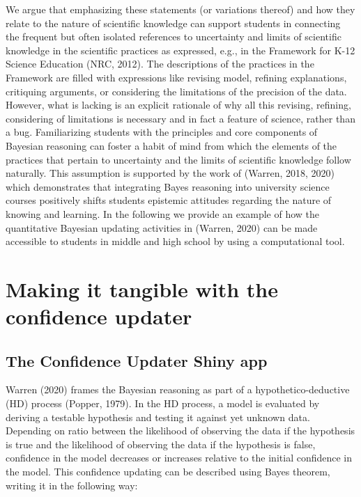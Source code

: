 We argue that emphasizing these statements (or variations thereof) and how they relate to the nature of scientific knowledge can support students in connecting the frequent but often isolated references to uncertainty and limits of scientific knowledge in the scientific practices as expressed, e.g., in the Framework for K-12 Science Education (NRC, 2012). The descriptions of the practices in the Framework are filled with expressions like revising model, refining explanations, critiquing arguments, or considering the limitations of the precision of the data. However, what is lacking is an explicit rationale of why all this revising, refining, considering of limitations is necessary and in fact a feature of science, rather than a bug. Familiarizing students with the principles and core components of Bayesian reasoning can foster a habit of mind from which the elements of the practices that pertain to uncertainty and the limits of scientific knowledge follow naturally. This assumption is supported by the work of (Warren, 2018, 2020) which demonstrates that integrating Bayes reasoning into university science courses positively shifts students epistemic attitudes regarding the nature of knowing and learning. In the following we provide an example of how the quantitative Bayesian updating activities in (Warren, 2020) can be made accessible to students in middle and high school by using a computational tool. 

\section{Making it tangible with the confidence updater}

\subsection{The Confidence Updater Shiny app}

Warren (2020) frames the Bayesian reasoning as part of a hypothetico-deductive (HD) process (Popper, 1979). In the HD process, a model is evaluated by deriving a testable hypothesis and testing it against yet unknown data. Depending on ratio between the likelihood of observing the data if the hypothesis is true and the likelihood of observing the data if the hypothesis is false, confidence in the model decreases or increases relative to the initial confidence in the model. This confidence updating can be described using Bayes theorem, writing it in the following way: 

